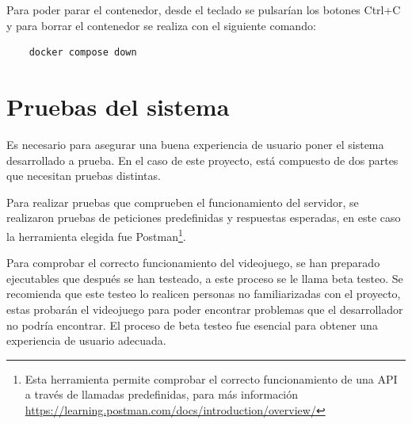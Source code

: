 Para poder parar el contenedor, desde el teclado se pulsarían los botones Ctrl+C y para borrar el contenedor se realiza con el siguiente comando:
\begin{lstlisting}
    docker compose down
\end{lstlisting}



\section{Pruebas del sistema}
Es necesario para asegurar una buena experiencia de usuario poner el sistema desarrollado a prueba. En el caso de este proyecto, está compuesto de dos partes que necesitan pruebas distintas.

Para realizar pruebas que comprueben el funcionamiento del servidor, se realizaron pruebas de peticiones predefinidas y respuestas esperadas, en este caso la herramienta elegida fue Postman\footnote{Esta herramienta permite comprobar el correcto funcionamiento de una API a través de llamadas predefinidas, para más información \url{https://learning.postman.com/docs/introduction/overview/}}.

Para comprobar el correcto funcionamiento del videojuego, se han preparado ejecutables que después se han testeado, a este proceso se le llama beta testeo. Se recomienda que este testeo lo realicen personas no familiarizadas con el proyecto, estas probarán el videojuego para poder encontrar problemas que el desarrollador no podría encontrar. El proceso de beta testeo fue esencial para obtener una experiencia de usuario adecuada.

